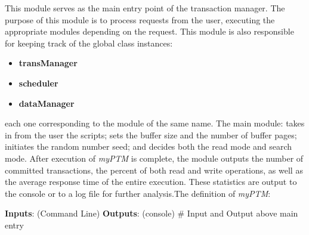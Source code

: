 This module serves as the main entry point of the transaction manager. The purpose of this module is to process requests from the user, executing the appropriate modules depending on the request. This module is also responsible for keeping track of the global class instances:

\begin{itemize}
 \item \textbf{transManager} 
 \item \textbf{scheduler} 
 \item  \textbf{dataManager} 
 \end{itemize}

each one corresponding to the module of the same name. The main module: takes in from the user the scripts; sets the buffer size and the number of buffer pages; initiates the random number seed; and decides both the read mode and search mode. After execution of \textit{myPTM} is complete, the module outputs the number of committed transactions, the percent of both read and write operations, as well as the average response time of the entire execution. These statistics are output to the console or to a log file for further analysis.The definition of \textit{myPTM}:\\

\begin{mdframed}
\begin{algorithmic}[H]

    \State \textbf{Inputs}: (Command Line)
    \State {}
    \State {}
     \State {}
     \State {}
     \State {}
      \State {}
      \State {}
      \State \textbf{Outputs}: (console)
       \State {}
        \State {}
         \State {}
    	 \State {}
	\State \# Input and Output above
	 {} 
	\State main entry
	\EndFunction  
\end{algorithmic} 
\end{mdframed} 


